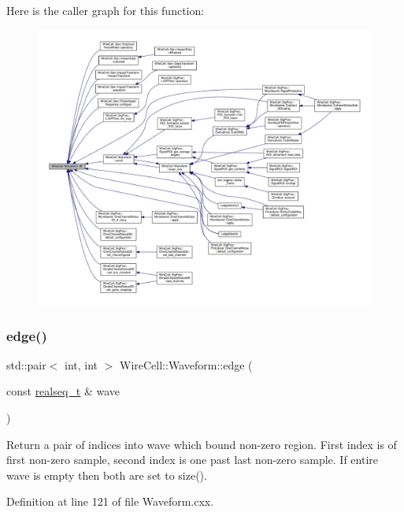 Here is the caller graph for this function\+:
\nopagebreak
\begin{figure}[H]
\begin{center}
\leavevmode
\includegraphics[width=350pt]{namespace_wire_cell_1_1_waveform_a6cfae9f74c1bf06f69d6991f3f82cef5_icgraph}
\end{center}
\end{figure}
\mbox{\label{namespace_wire_cell_1_1_waveform_ae368e58f014b0d634028afcbb05887cb}} 
\subsubsection{\texorpdfstring{edge()}{edge()}}
{\footnotesize\ttfamily std\+::pair$<$ int, int $>$ Wire\+Cell\+::\+Waveform\+::edge (\begin{DoxyParamCaption}\item[{const \hyperlink{namespace_wire_cell_1_1_waveform_a479175e541c8545e87cd8063b74b6956}{realseq\+\_\+t} \&}]{wave }\end{DoxyParamCaption})}

Return a pair of indices into wave which bound non-\/zero region. First index is of first non-\/zero sample, second index is one past last non-\/zero sample. If entire wave is empty then both are set to size(). 

Definition at line 121 of file Waveform.\+cxx.

